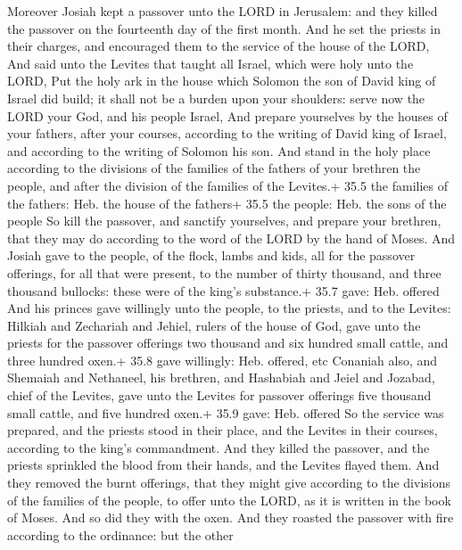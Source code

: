  Moreover Josiah kept a passover unto the LORD in Jerusalem:
and they killed the passover on the fourteenth day of the first month.
 And he set the priests in their charges, and encouraged
them to the service of the house of the LORD,  And said unto
the Levites that taught all Israel, which were holy unto the LORD, Put
the holy ark in the house which Solomon the son of David king of Israel
did build; it shall not be a burden upon your shoulders: serve now the
LORD your God, and his people Israel,  And prepare
yourselves by the houses of your fathers, after your courses, according
to the writing of David king of Israel, and according to the writing of
Solomon his son.  And stand in the holy place according to
the divisions of the families of the fathers of your brethren the
people, and after the division of the families of the Levites.+ 35.5 the
families of the fathers: Heb. the house of the fathers+ 35.5 the people:
Heb. the sons of the people  So kill the passover, and
sanctify yourselves, and prepare your brethren, that they may do
according to the word of the LORD by the hand of Moses.  And
Josiah gave to the people, of the flock, lambs and kids, all for the
passover offerings, for all that were present, to the number of thirty
thousand, and three thousand bullocks: these were of the king's
substance.+ 35.7 gave: Heb. offered  And his princes gave
willingly unto the people, to the priests, and to the Levites: Hilkiah
and Zechariah and Jehiel, rulers of the house of God, gave unto the
priests for the passover offerings two thousand and six hundred small
cattle, and three hundred oxen.+ 35.8 gave willingly: Heb. offered, etc
 Conaniah also, and Shemaiah and Nethaneel, his brethren,
and Hashabiah and Jeiel and Jozabad, chief of the Levites, gave unto the
Levites for passover offerings five thousand small cattle, and five
hundred oxen.+ 35.9 gave: Heb. offered  So the service was
prepared, and the priests stood in their place, and the Levites in their
courses, according to the king's commandment.  And they
killed the passover, and the priests sprinkled the blood from their
hands, and the Levites flayed them.  And they removed the
burnt offerings, that they might give according to the divisions of the
families of the people, to offer unto the LORD, as it is written in the
book of Moses. And so did they with the oxen.  And they
roasted the passover with fire according to the ordinance: but the other
